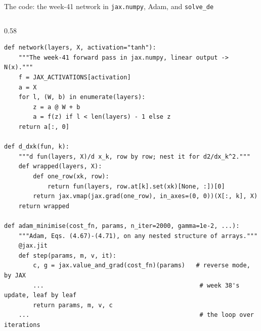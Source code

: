 \documentclass[10pt,aspectratio=169]{beamer}
\begin{document}
\begin{frame}[fragile]{The code: the week-41 network in \texttt{jax.numpy}, Adam, and \texttt{solve\_de}}
\vspace{-3pt}
\begin{columns}[T]
\begin{column}{0.58\textwidth}
\lstset{basicstyle=\ttfamily\tiny}
\begin{lstlisting}
def network(layers, X, activation="tanh"):
    """The week-41 forward pass in jax.numpy, linear output -> N(x)."""
    f = JAX_ACTIVATIONS[activation]
    a = X
    for l, (W, b) in enumerate(layers):
        z = a @ W + b
        a = f(z) if l < len(layers) - 1 else z
    return a[:, 0]

def d_dxk(fun, k):
    """d fun(layers, X)/d x_k, row by row; nest it for d2/dx_k^2."""
    def wrapped(layers, X):
        def one_row(xk, row):
            return fun(layers, row.at[k].set(xk)[None, :])[0]
        return jax.vmap(jax.grad(one_row), in_axes=(0, 0))(X[:, k], X)
    return wrapped

def adam_minimise(cost_fn, params, n_iter=2000, gamma=1e-2, ...):
    """Adam, Eqs. (4.67)-(4.71), on any nested structure of arrays."""
    @jax.jit
    def step(params, m, v, it):
        c, g = jax.value_and_grad(cost_fn)(params)   # reverse mode, by JAX
        ...                                           # week 38's update, leaf by leaf
        return params, m, v, c
    ...                                               # the loop over iterations


\end{lstlisting}
\end{column}
\end{columns}
\end{frame}
\end{document}
